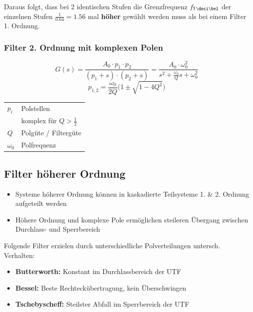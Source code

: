 Daraus folgt, dass bei 2 identischen Stufen die Grenzfrequenz $f_{3 \, \deci \bel}$ der einzelnen Stufen $\frac{1}{0.64} = 1.56$ mal 
\textbf{höher} gewählt werden muss als bei einem Filter 1. Ordnung.


\subsubsection{Filter 2. Ordnung mit komplexen Polen}

\begin{minipage}[c]{0.6\columnwidth}
    $$ G(s) = \frac{A_0 \cdot p_1 \cdot p_2}{(p_1 + s) \cdot (p_2 + s)} = \frac{A_0 \cdot \omega_0^2}{s^2 + \frac{\omega_0}{Q} s + \omega_0^2} $$
$$ p_{1,2} = \frac{\omega_0}{2 Q} \big(1 \pm \sqrt{1 - 4 Q^2} \big) $$
\end{minipage}
\hfill
\begin{minipage}[c]{0.38\columnwidth}
    \begin{tabular}{ll}
        $p_i$       & Polstellen \\
                    & komplex für $Q > \frac{1}{2}$ \\
        $Q$         & Polgüte / Filtergüte \\
        $\omega_0$  & Polfrequenz
    \end{tabular}
\end{minipage}


\subsection{Filter höherer Ordnung}

\begin{itemize}
    \item Systeme höherer Ordnung können in kaskadierte Teilsysteme 1. \& 2. Ordnung aufgeteilt werden
    \item Höhere Ordnung und komplexe Pole ermöglichen steileren Übergang zwischen Durchlass- und Sperrbereich
\end{itemize}

Folgende Filter erzielen durch unterschiedliche Polverteilungen untersch. Verhalten:

\begin{itemize}
    \item \textbf{Butterworth:} Konstant im Durchlassbereich der UTF
    \item \textbf{Bessel:} Beste Rechteckübertragung, kein Überschwingen
    \item \textbf{Tschebyscheff:} Steilster Abfall im Sperrbereich der UTF
\end{itemize}


